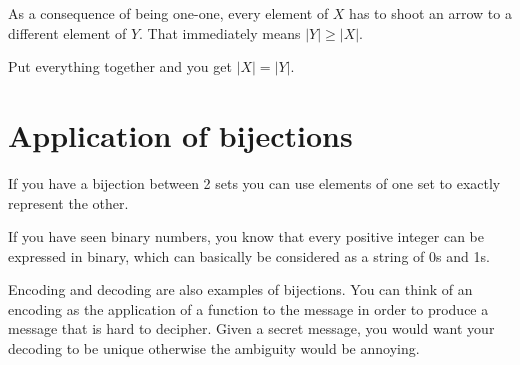 \documentclass[12pt]{article}
\begin{document}
As a consequence of being one-one, every element of $X$ has to shoot an arrow to a different element of $Y$. That immediately means $|Y| \ge |X|$. 

Put everything together and you get $|X| = |Y|$.

\section*{Application of bijections}

If you have a bijection between 2 sets you can use elements of one set to exactly represent the other.

If you have seen binary numbers, you know that every positive integer can be expressed in binary, which can basically be considered as a string of 0s and 1s. 

Encoding and decoding are also examples of bijections. You can think of an encoding as the application of a function to the message in order to produce a message that is hard to decipher. Given a secret message, you would want your decoding to be unique otherwise the ambiguity would be annoying.
\end{document}
